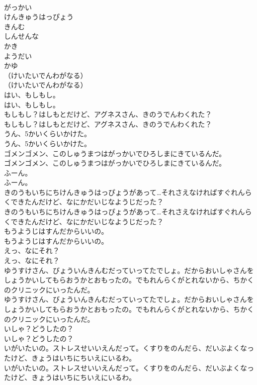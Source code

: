 \documentclass[8pt]{extreport}
\begin{document}
\begin{CJK}{UTF8}{min}
\\	がっかい
\\	けんきゅうはっぴょう
\\	きんむ
\\	しんせんな
\\	かき
\\	ようだい
\\	かゆ
\\	（けいたいでんわがなる）
\\	（けいたいでんわがなる）
\\	はい、もしもし。
\\	はい、もしもし。
\\	もしもし？はしもとだけど、アグネスさん、きのうでんわくれた？
\\	もしもし？はしもとだけど、アグネスさん、きのうでんわくれた？
\\	うん、5かいくらいかけた。
\\	うん、5かいくらいかけた。
\\	ゴメンゴメン、このしゅうまつはがっかいでひろしまにきているんだ。
\\	ゴメンゴメン、このしゅうまつはがっかいでひろしまにきているんだ。
\\	ふーん。
\\	ふーん。
\\	きのうもいちにちけんきゅうはっぴょうがあって…それさえなければすぐれんらくできたんだけど、なにかだいじなようじだった？
\\	きのうもいちにちけんきゅうはっぴょうがあって…それさえなければすぐれんらくできたんだけど、なにかだいじなようじだった？
\\	もうようじはすんだからいいの。
\\	もうようじはすんだからいいの。
\\	えっ、なにそれ？
\\	えっ、なにそれ？
\\	ゆうすけさん、びょういんきんむだっていってたでしょ。だからおいしゃさんをしょうかいしてもらおうかとおもったの。でもれんらくがとれないから、ちかくのクリニックにいったんだ。
\\	ゆうすけさん、びょういんきんむだっていってたでしょ。だからおいしゃさんをしょうかいしてもらおうかとおもったの。でもれんらくがとれないから、ちかくのクリニックにいったんだ。
\\	いしゃ？どうしたの？
\\	いしゃ？どうしたの？
\\	いがいたいの。ストレスせいいえんだって。くすりをのんだら、だいぶよくなったけど、きょうはいちにちいえにいるわ。
\\	いがいたいの。ストレスせいいえんだって。くすりをのんだら、だいぶよくなったけど、きょうはいちにちいえにいるわ。

\end{CJK}
\end{document}
